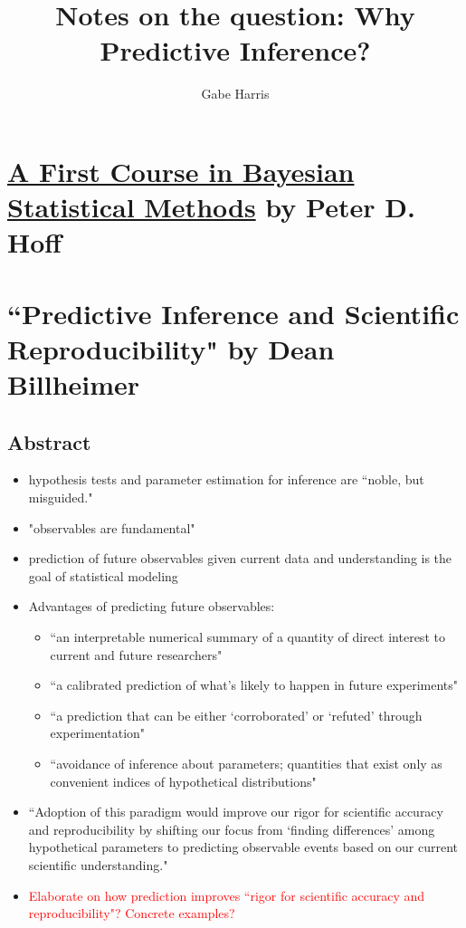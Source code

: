 \documentclass[12pt, a4paper]{article}
\begin{document}
% 
% 





\title{Notes on the question:  Why Predictive Inference?}
\author{\Large Gabe Harris}
\maketitle

\section{\underline{A First Course in Bayesian Statistical Methods} by Peter D. Hoff}



\section{``Predictive Inference and Scientific Reproducibility" by Dean Billheimer}

\subsection{Abstract}

\begin{itemize}
  \item hypothesis tests and parameter estimation for inference are ``noble, but misguided."
  \item "observables are fundamental"
  \item prediction of future observables given current data and understanding is the goal of statistical modeling
  \item Advantages of predicting future observables:
    \begin{itemize}
      \item ``an interpretable numerical summary of a quantity of direct interest to current and future researchers"
      \item ``a calibrated prediction of what's likely to happen in future experiments"
      \item ``a prediction that can be either `corroborated' or `refuted' through experimentation"
      \item ``avoidance of inference about parameters; quantities that exist only as convenient indices of hypothetical distributions"
    \end{itemize}
  \item ``Adoption of this paradigm would improve our rigor for scientific accuracy and reproducibility by shifting our focus from `finding differences' among hypothetical parameters to predicting observable events based on our current scientific understanding."
  \item \textcolor{red}{Elaborate on how prediction improves ``rigor for scientific accuracy and reproducibility"?  Concrete examples?}
\end{itemize}
\end{document}
